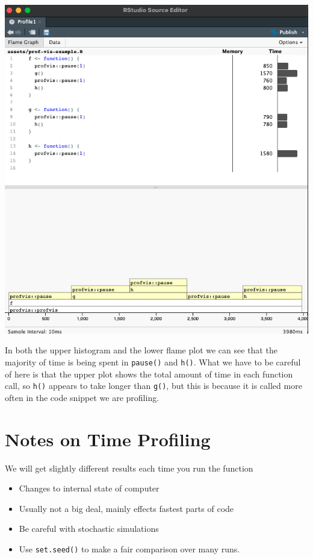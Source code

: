 \documentclass[
  12pt,
]{book}
\providecommand{\tightlist}{%
  \setlength{\itemsep}{0pt}\setlength{\parskip}{0pt}}
\begin{document}
\includegraphics[width=1\linewidth]{images/403-production-scalability/profiling-example-speed}

In both the upper histogram and the lower flame plot we can see that the majority of time is being spent in \texttt{pause()} and \texttt{h()}. What we have to be careful of here is that the upper plot shows the total amount of time in each function call, so \texttt{h()} appears to take longer than \texttt{g()}, but this is because it is called more often in the code snippet we are profiling.

\hypertarget{notes-on-time-profiling}{%
\section{Notes on Time Profiling}\label{notes-on-time-profiling}}

We will get slightly different results each time you run the function

\begin{itemize}
\tightlist
\item
  Changes to internal state of computer
\item
  Usually not a big deal, mainly effects fastest parts of code
\item
  Be careful with stochastic simulations
\item
  Use \texttt{set.seed()} to make a fair comparison over many runs.
\end{itemize}
\end{document}
